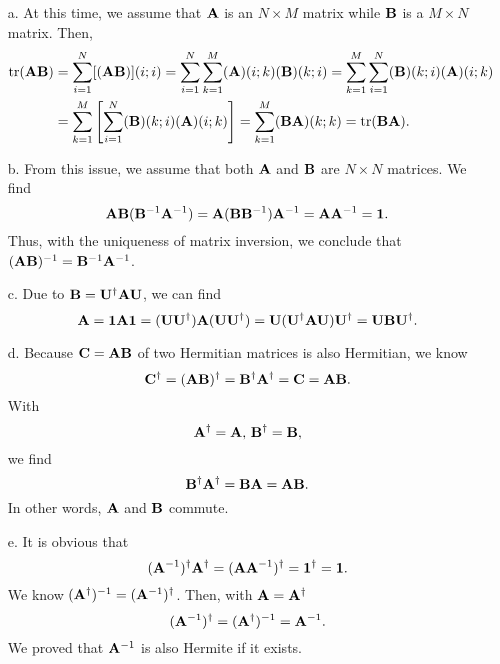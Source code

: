 \documentclass[a4paper]{book}
\newcommand\tr[1]{\mathrm{tr(#1)}}
\newcommand{\A}{{\bf A}}
\newcommand{\B}{{\bf B}}
\newcommand{\C}{{\bf C}}
\newcommand{\I}{{\bf 1}}
\newcommand{\U}{{\bf U}}
\begin{document}
	\begin{solution}
	\begin{enumerate}
	
	\item[a.] At this time, we assume that $\A$ is an $N \times M$ matrix while $\B$ is a $M \times N$ matrix. Then,
	\begin{align}
		\tr{\A\B} &= \sum_{i=1}^N [(\A\B)](i;i) = \sum_{i=1}^N \sum_{k=1}^M (\A)(i;k) (\B)(k;i) = \sum_{k=1}^M \sum_{i=1}^N (\B)(k;i) (\A)(i;k)  \notag \\
		&= \sum_{k=1}^M \left[ \sum_{i=1}^N (\B)(k;i) (\A)(i;k) \right] = \sum_{k=1}^M (\B\A)(k;k) = \tr{\B\A}.
	\end{align}
	
	\item[b.] From this issue, we assume that both $\A$ and $\B$ are $N \times N$ matrices. We find
	\begin{equation}
		\A\B (\B^{-1}\A^{-1}) = \A(\B \B^{-1})\A^{-1} = \A \A^{-1} = \I.
	\end{equation}
	Thus, with the uniqueness of matrix inversion, we conclude that $(\A\B)^{-1}=\B^{-1}\A^{-1}$.
	
	\item[c.] Due to $\B = \U^\dagger \A \U$, we can find
	\begin{equation}
		\A = \I \A \I = (\U \U^\dagger) \A (\U \U^\dagger) = \U (\U^\dagger \A \U )\U^\dagger = \U \B \U^\dagger.
	\end{equation}
	
	\item[d.] Because $\C=\A\B$ of two Hermitian matrices is also Hermitian, we know
	\[
		\C^\dagger = (\A\B)^\dagger = \B^\dagger \A^\dagger = \C = \A \B. 
	\]
	With
	\[
		\A^\dagger = \A, \, \B^\dagger = \B,
	\]
	we find
	\begin{equation}
		\B^\dagger \A^\dagger = \B \A = \A \B.
	\end{equation}
	In other words, $\A$ and $\B$ commute.
	
	\item[e.] It is obvious that
	\[
		(\A^{-1})^\dagger \A^\dagger = (\A \A^{-1})^\dagger = \I^\dagger = \I.
	\]
	We know $(\A^\dagger)^{-1} = (\A^{-1})^\dagger$. Then, with $\A = \A^\dagger$
	\begin{equation}
		(\A^{-1})^\dagger = (\A^\dagger)^{-1} = \A^{-1}.
	\end{equation}
	We proved that $\A^{-1}$ is also Hermite if it exists.
	

\end{enumerate}
\end{solution}
\end{document}
